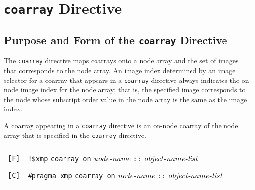 \section{{\tt coarray} Directive}
\subsection{Purpose and Form of the {\tt coarray} Directive}

The {\tt coarray} directive maps coarrays onto a node array and
the set of images that corresponds to the node array.
An image index determined by an image selector for a coarray
that appears in a {\tt coarray} directive
always indicates the on-node image index for the node array;
that is, the specified image corresponds to the node whose subscript
order value in the node array is the same as the image index.

A coarray appearing in a {\tt coarray} directive is an on-node coarray
of the node array that is specified in the {\tt coarray} directive.


\medskip


\begin{tabular}{llll}
 & & & \\
\verb![F]!&\verb|!$xmp| {\tt coarray on} {\it node-name} {\tt ::} {\it object-name-list}\\
 & & & \\
\verb![C]!&\verb|#pragma xmp| {\tt coarray on} {\it node-name} {\tt ::} {\it object-name-list}\\
 & & & 
\end{tabular}


